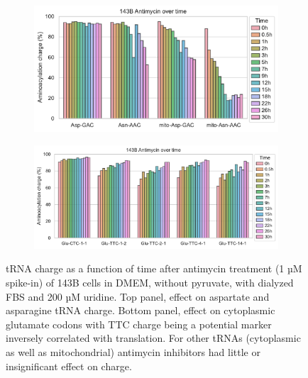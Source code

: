 \begin{figure}[!ht]
     \centering
     \begin{subfigure}[b]{0.6\textwidth}
         \includegraphics[width=\textwidth]{figures/sapp/tRNA/143B_Anti-time_Asp-Asn.pdf}
     \end{subfigure}
     \begin{subfigure}[b]{0.7\textwidth}
         \vspace{5pt}
         \includegraphics[width=\textwidth]{figures/sapp/tRNA/143B_Anti-time_Glu.pdf}
     \end{subfigure}
     \hfill
        \caption[Antimycin time-series in 143B, effect on tRNA charge]{
        tRNA charge as a function of time after antimycin treatment (1 µM spike-in) of 143B cells in DMEM, without pyruvate, with dialyzed FBS and 200 µM uridine.
        Top panel, effect on aspartate and asparagine tRNA charge.
        Bottom panel, effect on cytoplasmic glutamate codons with TTC charge being a potential marker inversely correlated with translation.
        For other tRNAs (cytoplasmic as well as mitochondrial) antimycin inhibitors had little or insignificant effect on charge.
        }
        \label{fig:sapp:tRNA:143B_Anti_time}
\end{figure}




